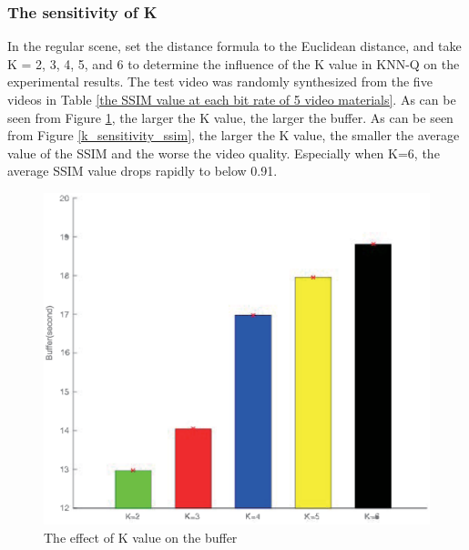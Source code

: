 \documentclass[twocolumn]{article}
\begin{document}
\subsubsection{The sensitivity of K}
In the regular scene, set the distance formula to the Euclidean distance, 
and take K = 2, 3, 4, 5, and 6 to determine the influence of the K value in KNN-Q on the 
experimental results. The test video was randomly synthesized from the five videos in 
Table \ref{the SSIM value at each bit rate of 5 video materials}. 
As can be seen from Figure \ref{k_sensitivity_buffer}, the larger the K value, the larger the buffer. 
As can be seen from Figure \ref{k_sensitivity_ssim}, the larger the K value, the smaller the average 
value of the SSIM and the worse the video quality. Especially when K=6, the 
average SSIM value drops rapidly to below 0.91.
\begin{figure}[htbp]
\centering
\includegraphics[width=\columnwidth]{k_sensitivity_buffer}
\caption{The effect of K value on the buffer}
\label{k_sensitivity_buffer}
\end{figure}
\end{document}
